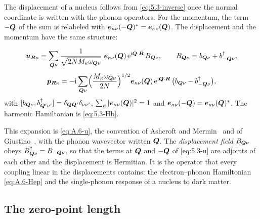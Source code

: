 The displacement of a nucleus follows from \cref{eq:5.3-inverse} once the normal coordinate is written with the phonon operators. For the momentum, the term $-\bm{Q}$ of the sum is relabeled with $\bm{e}_{\kappa\nu}(-\bm{Q})^* = \bm{e}_{\kappa\nu}(\bm{Q})$. The displacement and the momentum have the same structure:
\begin{keyresult}
\begin{equation}
  \bm{u}_{\bm{R}\kappa} = \sum_{\bm{Q}\nu}\frac{1}{\sqrt{2NM_\kappa\omega_{\bm{Q}\nu}}}\;\bm{e}_{\kappa\nu}(\bm{Q})\,\mathrm{e}^{\mathrm{i}\bm{Q}\cdot\bm{R}}\,B_{\bm{Q}\nu} , \qquad
  B_{\bm{Q}\nu} = b_{\bm{Q}\nu} + b^\dagger_{-\bm{Q}\nu} ,
  \label{eq:5.3-u}
\end{equation}
\begin{equation*}
  \bm{p}_{\bm{R}\kappa} = -\mathrm{i}\sum_{\bm{Q}\nu}\Bigl(\frac{M_\kappa\omega_{\bm{Q}\nu}}{2N}\Bigr)^{1/2}\bm{e}_{\kappa\nu}(\bm{Q})\,\mathrm{e}^{\mathrm{i}\bm{Q}\cdot\bm{R}}\,\bigl(b_{\bm{Q}\nu} - b^\dagger_{-\bm{Q}\nu}\bigr) ,
\end{equation*}
with $[b_{\bm{Q}\nu}, b^\dagger_{\bm{Q}'\nu'}] = \delta_{\bm{Q}\bm{Q}'}\delta_{\nu\nu'}$, $\sum_\kappa|\bm{e}_{\kappa\nu}(\bm{Q})|^2 = 1$ and $\bm{e}_{\kappa\nu}(-\bm{Q}) = \bm{e}_{\kappa\nu}(\bm{Q})^*$. The harmonic Hamiltonian is \cref{eq:5.3-Hb}.
\end{keyresult}
This expansion is \cref{eq:A.6-u}, the convention of Ashcroft and Mermin~\cite[Chap.~23]{ashcroft1976solid} and of Giustino~\cite[Eqs.~(16)--(21)]{giustino2017electron}, with the phonon wavevector written $\bm{Q}$. The \emph{displacement field} $B_{\bm{Q}\nu}$ obeys $B^\dagger_{\bm{Q}\nu} = B_{-\bm{Q}\nu}$, so that the terms at $\bm{Q}$ and $-\bm{Q}$ of \cref{eq:5.3-u} are adjoints of each other and the displacement is Hermitian. It is the operator that every coupling linear in the displacements contains: the electron--phonon Hamiltonian \cref{eq:A.6-Hep} and the single-phonon response of a nucleus to dark matter.

\subsection{The zero-point length}

